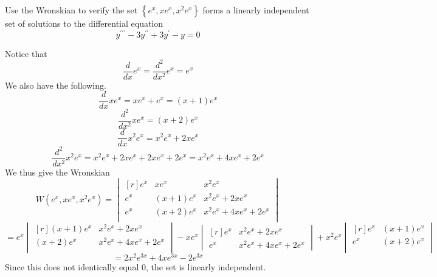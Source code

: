 \begin{exercise}
    Use the Wronskian to verify the set \(\left\{ e^x,xe^x,x^2 e^x \right\} \) forms a linearly independent set of solutions to the differential equation 
    \[
        y^{\prime\prime\prime} -3y^{\prime\prime} +3y^{\prime} -y=0
    \]
\end{exercise}
\begin{longsolution}
    Notice that
    \[\frac{d}{dx}e^x = \frac{d^2}{dx^2}e^x = e^x\]
    We also have the following.
    \[
        \frac{d}{dx}xe^x = xe^x + e^x = (x+1)e^x
    \]
    \[
        \frac{d^2}{dx^2}xe^x = (x+2)e^x
    \]
    \[
        \frac{d}{dx}x^2 e^x = x^{2}e^x + 2xe^x
    \]
    \[
        \frac{d^2}{dx^2}x^2 e^x = x^2 e^x + 2xe^x + 2xe^x + 2e^x = x^{2}e^x + 4xe^x + 2e^x 
    \]
    We thus give the Wronskian 
    \[
        W \left( e^x,xe^x,x^2 e^x \right) =\begin{vmatrix}[r]
            e^x & xe^x &x^2 e^x   \\
             e^{x} & (x+1)e^x &x^{2}e^x + 2xe^x    \\
             e^x&(x+2)e^x  &x^{2}e^x + 4xe^x + 2e^x    \\
        \end{vmatrix}
    \]
    \[
        =e^x \begin{vmatrix}[r]
            (x+1)e^x &x^{2}e^x + 2xe^x   \\
            (x+2)e^x  &x^{2}e^x + 4xe^x + 2e^x   \\
        \end{vmatrix} - xe^x \begin{vmatrix}[r]
            e^{x}&x^{2}e^x + 2xe^x   \\ 
            e^x  &x^{2}e^x + 4xe^x + 2e^x
        \end{vmatrix} + x^2 e^x \begin{vmatrix}[r]
            e^{x} & (x+1)e^x   \\
             e^x&(x+2)e^x     \\
        \end{vmatrix}
    \]
    \[
        =2x^2 e^{3x}+4xe^{3x}-2e^{3x}   
    \]
    Since this does not identically equal \(0\), the set is linearly independent.
\end{longsolution}
